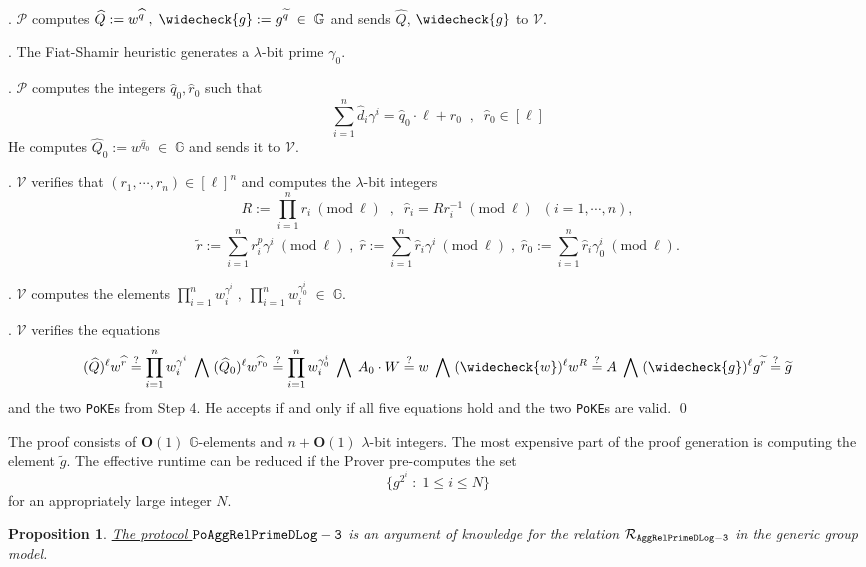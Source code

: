 \documentclass[11pt, lettersize, notitlepage, leqno, footskip=0.6cm]{article}
\newcommand{\pl}{\prod\limits}
\newcommand{\slim}{\sum\limits}
\newcommand{\bG}{\mathbb{G}}
\newcommand{\wti}{\widetilde}
\newcommand{\mc}{\mathcal}
\newcommand{\mb}{\mathbb}
\newcommand{\mbf}{\mathbf}
\newcommand{\lam}{\lambda}
\newcommand{\what}{\widehat}
\newcommand{\weck}{\widecheck}
\newcommand{\bO}{\mbf{O}}
\newcommand{\mP}{\mc{P}}
\newcommand{\V}{\mc{V}}
\newcommand{\vs}{\vspace{-0.15cm}}
\newcommand{\noin}{\noindent}
\newcommand{\sta}{\stackrel{?}{=}}
\newcommand{\Mod}[1]{\ (\mathrm{mod}\ #1)}
\newtheorem{Prop}[Thm]{Proposition}
\numberwithin{equation}{section}
\begin{document}
\begin{enumerate}[wide, labelwidth=!, labelindent=0pt]
\noin 11. $\mP$ computes $ \what{Q}:= w^{\what{q}}\;,\;\weck{g}:= g^{\wti{q}}\;\in\;\bG$ and sends $\what{Q}$, $\weck{g}$ to $\V$.

\noin 12. The Fiat-Shamir heuristic generates a $\lam$-bit prime $\gamma_{0}$.

\noin 13. $\mP$ computes the integers $\what{q}_0, \what{r}_0$ such that \vs $$\slim_{i=1}^n \what{d}_i\gamma^i = \what{q}_0\cdot \ell+\what{r}_0\;\;,\;\;\what{r}_0\in [\ell]$$ He computes $\what{Q}_0:= w^{\what{q}_0} \;\in\;\bG$ and sends it to $\V$.

\noin 14. $\V$ verifies that $(r_1,\cdots,r_n)\in [\ell]^{n}$ and computes the $\lam$-bit integers \vs $$R:= \pl_{i=1}^n r_i\Mod{\ell} \;\;,\;\;\what{r}_i = Rr_i^{-1}\Mod{\ell}\;\;(i=1,\cdots,n),$$\vspace{-0.3cm} $$\wti{r}:= \slim_{i=1}^n {r}_i^{p}\gamma^i\Mod{\ell} \;,\; \what{r}:= \slim_{i=1}^n \what{r}_i\gamma^i\Mod{\ell}\;,\;\what{r}_0:= \slim_{i=1}^n \what{r}_i\gamma_{0}^i\Mod{\ell}.$$

\noin 15. $\V$ computes the elements $\pl_{i=1}^n w_i^{\gamma^i}\;,\;\pl_{i=1}^n w_i^{\gamma_0^i}\;\in\;\bG$.

\noin 16. $\V$ verifies the equations \vs $$(\what{Q})^{\ell}w^{\what{r}}\sta \pl_{i=1}^n w_i^{\gamma^i} \;\bigwedge\; (\what{Q}_0)^{\ell}w^{\what{r}_0}\sta \pl_{i=1}^n w_i^{\gamma_{0}^i}\;\bigwedge\; A_0\cdot W\sta w\;\bigwedge\; (\weck{w})^{\ell}w^R\sta A\;\bigwedge\; (\weck{g})^{\ell}g^{\wti{r}}\sta\wti{g}$$ and the two \verb|PoKE|s from Step 4. He accepts if and only if all five equations hold and the two \verb|PoKE|s are valid. \qed \end{enumerate}

\noin The proof consists of $\bO(1)$ $\mb{G}$-elements and $n+\bO(1)$ $\lam$-bit integers. The most expensive part of the proof generation is computing the element $\wti{g}$. The effective runtime can be reduced if the Prover pre-computes the set $$\{g^{2^i}\;:\;1\leq i\leq N  \}$$ for an appropriately large integer $N$.

\vspace{0.15cm}

\begin{Prop} \hyperlink{RP3}{The protocol ${\tt{PoAggRelPrimeDLog}-3}$} is an argument of knowledge for the relation $\mc{R}_{\tt{AggRelPrimeDLog-3}}$ in the generic group model.\end{Prop}
\end{document}
